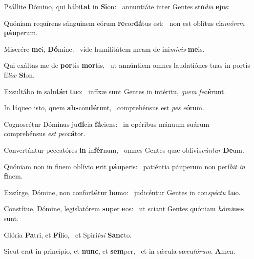 \item Psállite Dómino, qui hábi\textbf{tat} in \textbf{Si}on:~\psstar{} annuntiáte inter Gentes stú\textit{di}\textit{a} \textbf{e}jus:
\item Quóniam requírens sánguinem eórum \textbf{re}cor\textbf{dá}tus est:~\psstar{} non est oblítus cla\textit{mó}\textit{rem} \textbf{páu}perum.
\item Miserére \textbf{me}i, \textbf{Dó}mine:~\psstar{} vide humilitátem meam de ini\textit{mí}\textit{cis} \textbf{me}is.
\item Qui exáltas me de \textbf{por}tis \textbf{mor}tis,~\psstar{} ut annúntiem omnes laudatiónes tuas in portis fí\textit{li}\textit{æ} \textbf{Si}on.
\item Exsultábo in salu\textbf{tá}ri \textbf{tu}o:~\psstar{} infíxæ sunt Gentes in intéritu, \textit{quem} \textit{fe}\textbf{cé}runt.
\item In láqueo isto, quem \textbf{abs}con\textbf{dé}runt,~\psstar{} comprehénsus est \textit{pes} \textit{e}\textbf{ó}rum.
\item Cognoscétur Dóminus ju\textbf{dí}cia \textbf{fá}ciens:~\psstar{} in opéribus mánuum suárum comprehénsus \textit{est} \textit{pec}\textbf{cá}tor.
\item Convertántur peccatóres \textbf{in} in\textbf{fér}num,~\psstar{} omnes Gentes quæ oblivis\textit{cún}\textit{tur} \textbf{De}um.
\item Quóniam non in finem oblívio \textbf{e}rit \textbf{páu}peris:~\psstar{} patiéntia páuperum non perí\textit{bit} \textit{in} \textbf{fi}nem.
\item Exsúrge, Dómine, non confor\textbf{té}tur \textbf{ho}mo:~\psstar{} judicéntur Gentes in con\textit{spéctu} \textbf{tu}o.
\item Constítue, Dómine, legislatórem \textbf{su}per \textbf{e}os:~\psstar{} ut sciant Gentes quóniam \textit{hómi}\textbf{nes} sunt.
\item Glória \textbf{Pa}tri, et \textbf{Fí}lio,~\psstar{} et Spirí\textit{tu}\textit{i} \textbf{Sanc}to.
\item Sicut erat in princípio, et \textbf{nunc}, et \textbf{sem}per,~\psstar{} et in sǽcula sæcu\textit{ló}\textit{rum}. \textbf{A}men.
